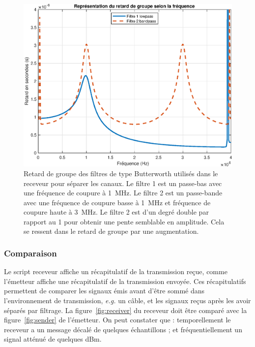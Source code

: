 \documentclass[10pt, oneside, a4paper]{article}
\begin{document}
\begin{figure}[p]
    \centering
    \includegraphics[height=0.4\textheight]{eps/grpdelay.eps}
    \caption{Retard de groupe des filtres de type Butterworth utilisés dans le receveur
             pour séparer les canaux.
             Le filtre 1 est un passe-bas avec une fréquence de coupure à \SI{1}{\mega\hertz}.
             Le filtre 2 est un passe-bande avec une fréquence de coupure basse à
             \SI{1}{\mega\hertz} et fréquence de coupure haute à \SI{3}{\mega\hertz}.
             Le filtre 2 est d'un degré double par rapport au 1 pour obtenir une pente
             semblable en amplitude. Cela se ressent dans le retard de groupe par une
             augmentation.}
    \label{fig:grpdelay}
\end{figure}

\subsubsection{Comparaison}
Le script receveur affiche un récapitulatif de la transmission reçue, comme l'émetteur affiche une récapitulatif de la transmission envoyée.
Ces récapitulatifs permettent de comparer les signaux émis avant d'être sommé dans l'environnement de transmission, \textit{e.g.} un câble, et les signaux reçus après les avoir séparés par filtrage.
La figure~\ref{fig:receiver} du receveur doit être comparé avec la figure~\ref{fig:sender} de l'émetteur.
On peut constater que : temporellement le receveur a un message décalé de quelques échantillons ; et fréquentiellement un signal atténué de quelques dBm.
\end{document}
